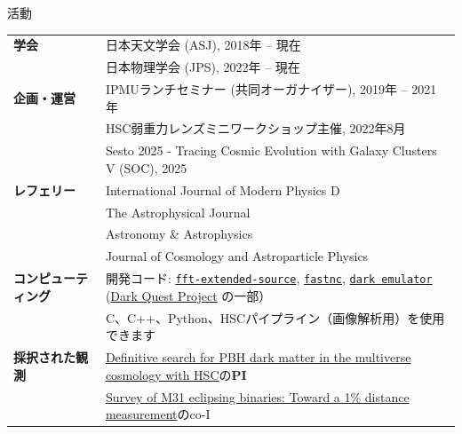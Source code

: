 \begin{rSection}{活動}
  \begin{tabular}{ @{} >{\bfseries}l @{\hspace{6ex}} p{}}
  学会                        & 日本天文学会 (ASJ), 2018年 -- 現在 \\
                              & 日本物理学会 (JPS), 2022年 -- 現在  \\
  企画・運営                  & IPMUランチセミナー (共同オーガナイザー), 2019年 -- 2021年 \\
                              & HSC弱重力レンズミニワークショップ主催, 2022年8月  \\
                              & Sesto 2025 - Tracing Cosmic Evolution with Galaxy Clusters V (SOC), 2025\\
  レフェリー                  & International Journal of Modern Physics D \\
                              & The Astrophysical Journal \\
                              & Astronomy \& Astrophysics \\
                              & Journal of Cosmology and Astroparticle Physics \\
  コンピューティング          & 開発コード: \href{https://github.com/git-sunao/fft-extended-source}{\tt fft-extended-source},
                                \href{https://github.com/git-sunao/fastnc}{\tt fastnc},
                                \href{https://dark-emulator.readthedocs.io/en/latest/}{\tt dark emulator} (\href{https://darkquestcosmology.github.io}{Dark Quest Project} の一部） \\
                              & C、C++、Python、HSCパイプライン（画像解析用）を使用できます \\
  採択された観測              & \href{https://subarutelescope.org/Observing/Schedule/S20B_abstract/S20B0032abst.html}{Definitive search for PBH dark matter in the multiverse cosmology with HSC}の\textbf{PI} \\
                              & \href{https://www.naoj.org/Observing/Schedule/s24b.html}{Survey of M31 eclipsing binaries: Toward a 1\% distance measurement}のco-I
  \end{tabular}
\end{rSection}

